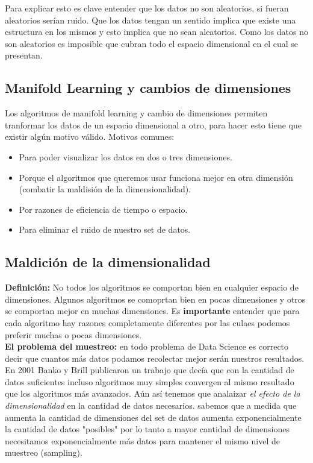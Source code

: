\documentclass[titlepage,a4paper]{article}
\begin{document}
Para explicar esto es clave entender que los datos no son aleatorios, si fueran aleatorios serían ruido. Que los datos tengan un sentido implica que existe una estructura en los mismos y esto implica que no sean aleatorios. Como los datos no son aleatorios es imposible que cubran todo el espacio dimensional en el cual se presentan. 

\subsection*{Manifold Learning y cambios de dimensiones}
Los algoritmos de manifold learning y cambio de dimensiones permiten tranformar los datos de un espacio dimensional a otro, para hacer esto tiene que existir algún motivo válido. Motivos comunes: 
\begin{itemize}
\item Para poder visualizar los datos en dos o tres dimensiones. 
\item Porque el algoritmos que queremos usar funciona mejor en otra dimensión (combatir la maldisión de la dimensionalidad). 
\item Por razones de eficiencia de tiempo o espacio. 
\item Para eliminar el ruido de nuestro set de datos. 
\end{itemize} 

\subsection*{Maldición de la dimensionalidad}
\textbf{Definición:} No todos los algoritmos se comportan bien en cualquier espacio de dimensiones. Algunos algoritmos se comoprtan bien en pocas dimensiones y otros se comportan mejor en muchas dimensiones. Es \textbf{importante} entender que para cada algoritmo hay razones completamente diferentes por las culaes podemos preferir muchas o pocas dimensiones. \\

\textbf{El problema del muestreo:} en todo problema de Data Science es correcto decir que cuantos más datos podamos recolectar mejor serán nuestros resultados. En 2001 Banko y Brill publicaron un trabajo que decía que con la cantidad de datos suficientes incluso algoritmos muy simples convergen al mismo resultado que los algoritmos más avanzados. Aún así tenemos que analaizar \textit{el efecto de la dimensionalidad} en la cantidad de datos necesarios. sabemos que a medida que aumenta la cantidad de dimensiones del set de datos aumenta exponencialmente la cantidad de datos "posibles" por lo tanto a mayor cantidad de dimensiones necesitamos exponencialmente más datos para mantener el mismo nivel de muestreo (sampling). \\
\end{document}
